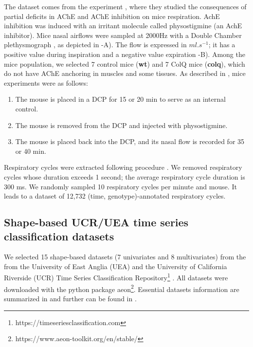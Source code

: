 The dataset comes from the experiment \cite{nervo2019respiratory}, where they studied the consequences of partial 
deficits in AChE and AChE inhibition on mice respiration. AchE inhibition was induced with an 
irritant molecule called physostigmine (an AchE inhibitor). Mice nasal airflows were sampled at 
2000Hz with a Double Chamber plethysmograph \cite{hoymann2012lung}, as depicted in -A). The flow is expressed in 
$ml.s^{-1}$; it has a positive value during inspiration and a negative value expiration -B). 
Among the mice population, we selected 7 control mice (\textbf{wt}) and 7 ColQ mice (\textbf{colq}), which do not have 
AChE anchoring in muscles and some tissues. 
As described in \cite{nervo2019respiratory}, mice experiments were as follows:
\begin{enumerate}
  \item The mouse is placed in a DCP for 15 or 20 min to serve as an internal control.
  \item The mouse is removed from the DCP and injected with physostigmine.
  \item The mouse is placed back into the DCP, and its nasal flow is recorded for 35 or 40 min.
\end{enumerate}

Respiratory cycles were extracted following procedure \cite{germain2023unsupervised}. We removed 
respiratory cycles whose duration exceeds 1 second; the average respiratory cycle duration is 
300 ms. We randomly sampled 10 respiratory cycles per minute and mouse. It leads to a dataset of 
12,732 (time, genotype)-annotated respiratory cycles. 

\subsection{Shape-based UCR/UEA time series classification datasets}
\label{appendix:classification_dataset}
We selected 15 shape-based datasets (7 univariates and 8 multivariates) from the from the University of East Anglia (UEA) and the University of California Riverside (UCR) Time Series Classification Repository\footnote{https://timeseriesclassification.com} \cite{dau2019ucr,bagnall2018uea}. All datasets were downloaded with the python package aeon\footnote{https://www.aeon-toolkit.org/en/stable/}. Essential datasets information are summarized in  and further can be found in \cite{dau2019ucr,bagnall2018uea}.


